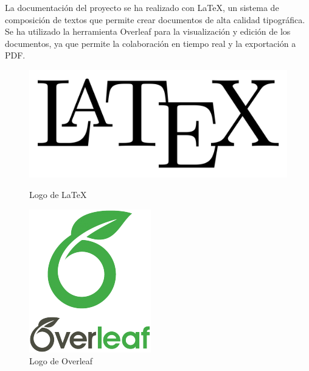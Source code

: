 La documentación del proyecto se ha realizado con LaTeX\cite{latex}, un sistema de composición de textos que permite crear documentos de alta calidad tipográfica.
Se ha utilizado la herramienta Overleaf\cite{overleaf} para la visualización y edición de los documentos, ya que permite la colaboración en tiempo real y la exportación a PDF.


\begin{figure}[H]
    \centering
    \begin{minipage}{0.2\textwidth}
        \centering
        \includegraphics[width=\textwidth]{figures/7-Construccion/LaTeX.png}
        \caption{Logo de LaTeX}
    \end{minipage}
    \hfill
    \begin{minipage}{0.2\textwidth}
        \centering
        \includegraphics[width=\textwidth]{figures/7-Construccion/Overleaf.png}
        \caption{Logo de Overleaf}
    \end{minipage}
\end{figure}


